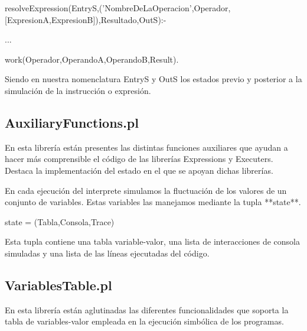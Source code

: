         resolveExpression(EntryS,('NombreDeLaOperacion',Operador,[ExpresionA,ExpresionB]),Resultado,OutS):-

            ...

            work(Operador,OperandoA,OperandoB,Result).

Siendo en nuestra nomenclatura EntryS y OutS los estados previo y posterior a la simulación de la instrucción o expresión.

\subsection*{AuxiliaryFunctions.pl}

En esta librería están presentes las distintas funciones auxiliares que ayudan a hacer más comprensible el código de las librerías Expressions y Executers.
Destaca la implementación del estado en el que se apoyan dichas librerías.

En cada ejecución del interprete simulamos la fluctuación de los valores de un conjunto de variables. 
Estas variables las manejamos mediante la tupla **state**.

        state = (Tabla,Consola,Trace)

Esta tupla contiene una tabla variable-valor, una lista de interacciones de consola simuladas y una lista de las líneas ejecutadas del código.

\subsection*{VariablesTable.pl}

En esta librería están aglutinadas las diferentes funcionalidades que soporta la tabla de variables-valor empleada en la ejecución simbólica de los programas.
